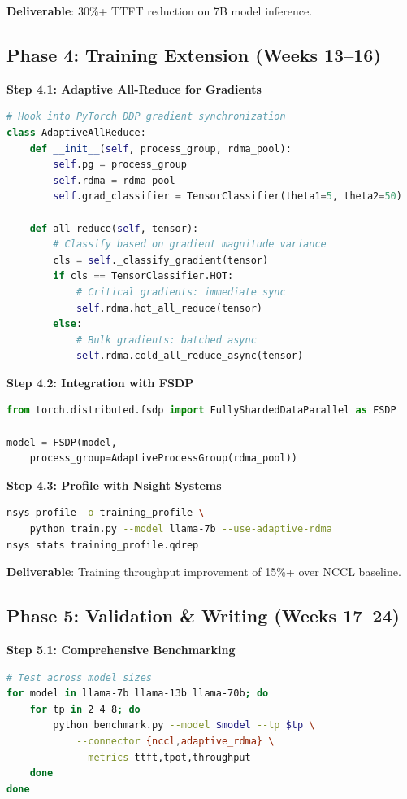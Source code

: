 \documentclass[10pt,letterpaper]{article}
\begin{document}
\textbf{Deliverable}: 30\%+ TTFT reduction on 7B model inference.

\subsection{Phase 4: Training Extension (Weeks 13--16)}

\textbf{Step 4.1: Adaptive All-Reduce for Gradients}
\begin{lstlisting}[language=Python]
# Hook into PyTorch DDP gradient synchronization
class AdaptiveAllReduce:
    def __init__(self, process_group, rdma_pool):
        self.pg = process_group
        self.rdma = rdma_pool
        self.grad_classifier = TensorClassifier(theta1=5, theta2=50)
        
    def all_reduce(self, tensor):
        # Classify based on gradient magnitude variance
        cls = self._classify_gradient(tensor)
        if cls == TensorClassifier.HOT:
            # Critical gradients: immediate sync
            self.rdma.hot_all_reduce(tensor)
        else:
            # Bulk gradients: batched async
            self.rdma.cold_all_reduce_async(tensor)
\end{lstlisting}

\textbf{Step 4.2: Integration with FSDP}
\begin{lstlisting}[language=Python]
from torch.distributed.fsdp import FullyShardedDataParallel as FSDP

model = FSDP(model, 
    process_group=AdaptiveProcessGroup(rdma_pool))
\end{lstlisting}

\textbf{Step 4.3: Profile with Nsight Systems}
\begin{lstlisting}[language=bash]
nsys profile -o training_profile \
    python train.py --model llama-7b --use-adaptive-rdma
nsys stats training_profile.qdrep
\end{lstlisting}

\textbf{Deliverable}: Training throughput improvement of 15\%+ over NCCL baseline.

\subsection{Phase 5: Validation \& Writing (Weeks 17--24)}

\textbf{Step 5.1: Comprehensive Benchmarking}
\begin{lstlisting}[language=bash]
# Test across model sizes
for model in llama-7b llama-13b llama-70b; do
    for tp in 2 4 8; do
        python benchmark.py --model $model --tp $tp \
            --connector {nccl,adaptive_rdma} \
            --metrics ttft,tpot,throughput
    done
done
\end{lstlisting}
\end{document}
